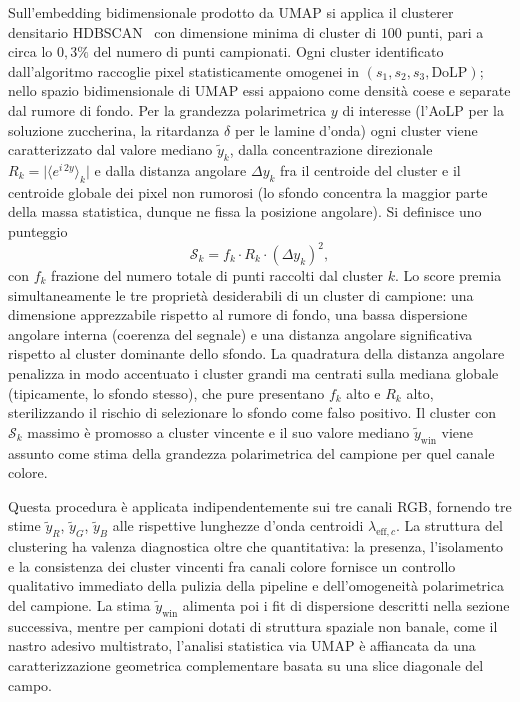 Sull'embedding bidimensionale prodotto da UMAP si applica il clusterer densitario HDBSCAN~\cite{Campello2013hdbscan} con dimensione minima di cluster di $100$ punti, pari a circa lo $0{,}3\%$ del numero di punti campionati. Ogni cluster identificato dall'algoritmo raccoglie pixel statisticamente omogenei in $(s_1, s_2, s_3, \mathrm{DoLP})$; nello spazio bidimensionale di UMAP essi appaiono come densità coese e separate dal rumore di fondo. Per la grandezza polarimetrica $y$ di interesse (l'AoLP per la soluzione zuccherina, la ritardanza $\delta$ per le lamine d'onda) ogni cluster viene caratterizzato dal valore mediano $\tilde y_k$, dalla concentrazione direzionale $R_k = \lvert \langle e^{i\,2y}\rangle_k \rvert$ e dalla distanza angolare $\Delta y_k$ fra il centroide del cluster e il centroide globale dei pixel non rumorosi (lo sfondo concentra la maggior parte della massa statistica, dunque ne fissa la posizione angolare). Si definisce uno punteggio
\begin{equation}
    \mathcal{S}_k = f_k \cdot R_k \cdot (\Delta y_k)^2,
    \label{eq:cluster_score}
\end{equation}
con $f_k$ frazione del numero totale di punti raccolti dal cluster $k$. Lo score premia simultaneamente le tre proprietà desiderabili di un cluster di campione: una dimensione apprezzabile rispetto al rumore di fondo, una bassa dispersione angolare interna (coerenza del segnale) e una distanza angolare significativa rispetto al cluster dominante dello sfondo. La quadratura della distanza angolare penalizza in modo accentuato i cluster grandi ma centrati sulla mediana globale (tipicamente, lo sfondo stesso), che pure presentano $f_k$ alto e $R_k$ alto, sterilizzando il rischio di selezionare lo sfondo come falso positivo. Il cluster con $\mathcal{S}_k$ massimo è promosso a cluster vincente e il suo valore mediano $\tilde y_{\mathrm{win}}$ viene assunto come stima della grandezza polarimetrica del campione per quel canale colore.

Questa procedura è applicata indipendentemente sui tre canali RGB, fornendo tre stime $\tilde y_R$, $\tilde y_G$, $\tilde y_B$ alle rispettive lunghezze d'onda centroidi $\lambda_{\mathrm{eff},c}$. La struttura del clustering ha valenza diagnostica oltre che quantitativa: la presenza, l'isolamento e la consistenza dei cluster vincenti fra canali colore fornisce un controllo qualitativo immediato della pulizia della pipeline e dell'omogeneità polarimetrica del campione. La stima $\tilde y_{\mathrm{win}}$ alimenta poi i fit di dispersione descritti nella sezione successiva, mentre per campioni dotati di struttura spaziale non banale, come il nastro adesivo multistrato, l'analisi statistica via UMAP è affiancata da una caratterizzazione geometrica complementare basata su una slice diagonale del campo.

